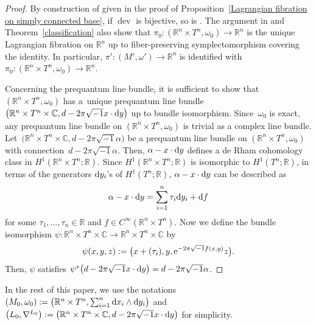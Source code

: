 \documentclass[pdftex]{sigma}
\numberwithin{equation}{section}
\newcommand{\C}{\mathbb{C}}
\newcommand{\R}{\mathbb{R}}
\renewcommand{\tilde}{\widetilde}
\def\dev{\operatorname{dev}}
\begin{document}
\begin{proof}
By construction of \smash{$\tilde \dev$} given in the proof of Proposition~\ref{Lagrangian fibration on simply connected base}, if $\dev$ is bijective, so is \smash{$\tilde \dev$}. The argument in \cite[p.\ 696]{Du} and Theorem~\ref{classification} also show that $\pi_0\colon (\R^n\times T^n,\omega_0)\to \R^n$ is the unique Lagrangian fibration on $\R^n$ up to fiber-preserving symplectomorphism covering the identity. In particular, $\pi'\colon (M',\omega')\to \R^n$ is identified with $\pi_0\colon (\R^n\times T^n,\omega_0)\to \R^n$.

Concerning the prequantum line bundle, it is sufficient to show that $(\R^n\times T^n,\omega_0)$ has a~unique prequantum line bundle $\bigl(\R^n\times T^n\times \C , d-2\pi\sqrt{-1}x\cdot {\rm d}y\bigr)$ up to bundle isomorphism. Since~$\omega_0$ is exact, any prequantum line bundle on $(\R^n\times T^n,\omega_0)$ is trivial as a complex line bundle. Let~${\bigl(\R^n\times T^n\times \C ,d-2\pi\sqrt{-1}\alpha\bigr)}$ be a prequantum line bundle on $(\R^n\times T^n,\omega_0)$ with connection~${d-2\pi\sqrt{-1}\alpha}$. Then, $\alpha-x\cdot {\rm d}y$ defines a de Rham cohomology class in $H^1(\R^n\times T^n; \R)$. Since $H^1(\R^n\times T^n; \R)$ is isomorphic to $H^1(T^n;\R)$, in terms of the generators ${\rm d}y_i$'s of $H^1(T^n;\R)$, $\alpha-x\cdot {\rm d}y$ can be described as
\[
\alpha-x\cdot {\rm d}y=\sum_{i=1}^n\tau_i{\rm d}y_i+{\rm d}f
\]
for some $\tau_1,\ldots ,\tau_n\in \R$ and $f\in C^\infty(\R^n\times T^n)$. Now we define the bundle isomorphism $\psi\colon \R^n\times T^n\times \C \to \R^n\times T^n\times \C$ by
\[
\psi(x,y,z):=\bigl(x+(\tau_i),y,{\rm e}^{-2\pi\sqrt{-1}f(x,y)}z\bigr) .
\]
Then, $\psi$ satisfies $\psi^*\bigl(d-2\pi\sqrt{-1}x\cdot {\rm d}y\bigr)=d-2\pi\sqrt{-1}\alpha$.
\end{proof}


In the rest of this paper, we use the notations $(M_0, \omega_0):=\bigl( \R^n\times T^n, \sum_{i=1}^n{\rm d}x_i\wedge {\rm d}y_i\bigr)$ and~${\bigl( L_0, \nabla^{L_0}\bigr):=\bigl(\R^n\times T^n\times \C , d-2\pi\sqrt{-1}x\cdot {\rm d}y\bigr)}$ for simplicity.
\end{document}
